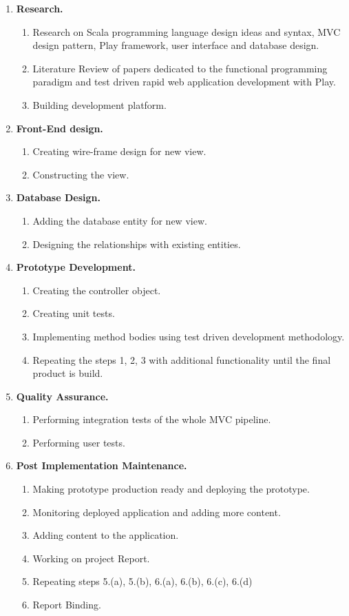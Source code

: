 \documentclass[12pt,twoside,a4paper]{report}
\begin{document}
\begin{enumerate}
\item \textbf{Research.}
	\begin{enumerate}
	\item Research on Scala programming language design ideas and syntax, MVC design pattern, Play framework, user interface and database design.
	\item Literature Review of papers dedicated to the functional programming paradigm and test driven rapid web application development with Play.
	\item Building development platform.
	\end{enumerate}
\item \textbf{Front-End design.}
	\begin{enumerate}
	\item Creating wire-frame design for new view.
	\item Constructing the view.
	\end{enumerate}
\item \textbf{Database Design.}
	\begin{enumerate}
	\item Adding the database entity for new view.
	\item Designing the relationships with existing entities.
	\end{enumerate}
\item \textbf{Prototype Development.}
	\begin{enumerate}
	\item Creating the controller object.
	\item Creating unit tests.
	\item Implementing method bodies using test driven development methodology.
	\item Repeating the steps 1, 2, 3 with additional functionality until the final product is build.
	\end{enumerate}
\item \textbf{Quality Assurance.}
	\begin{enumerate}
	\item Performing integration tests of the whole MVC pipeline.
	\item Performing user tests.
	\end{enumerate}
\item \textbf{Post Implementation Maintenance.}
	\begin{enumerate}
	\item Making prototype production ready and deploying the prototype.
	\item Monitoring deployed application and adding more content.
	\item Adding content to the application.
	\item Working on project Report.
	\item Repeating steps 5.(a), 5.(b), 6.(a), 6.(b), 6.(c), 6.(d)
	\item Report Binding.
	\end{enumerate}
\end{enumerate}
 
\end{document}
